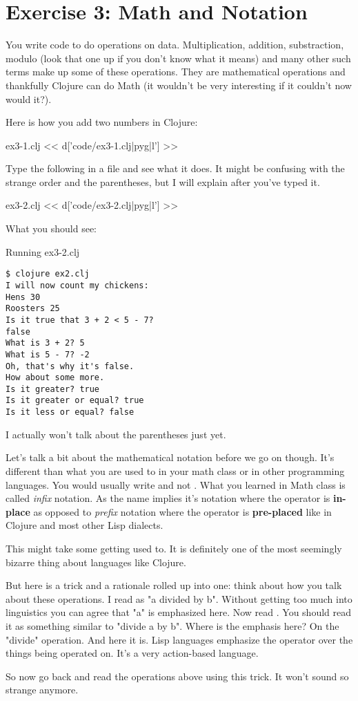 \chapter{Exercise 3: Math and Notation}

You write code to do operations on data. Multiplication, addition, substraction,
modulo (look that one up if you don't know what it means) and many other such terms make up some of these operations. They are mathematical operations and thankfully Clojure can do Math (it wouldn't be very interesting if it couldn't now would it?). 

Here is how you add two numbers in Clojure:
\begin{code}{ex3-1.clj}
<< d['code/ex3-1.clj|pyg|l'] >>
\end{code}

Type the following in a file and see what it does. It might be confusing with the
strange order and the parentheses, but I will explain after you've typed it.

\begin{code}{ex3-2.clj}
<< d['code/ex3-2.clj|pyg|l'] >>
\end{code}

What you should see:

\begin{code}{Running ex3-2.clj}
\begin{Verbatim}
$ clojure ex2.clj 
I will now count my chickens:
Hens 30
Roosters 25
Is it true that 3 + 2 < 5 - 7?
false
What is 3 + 2? 5
What is 5 - 7? -2
Oh, that's why it's false.
How about some more.
Is it greater? true
Is it greater or equal? true
Is it less or equal? false
\end{Verbatim}
\end{code}

I actually won't talk about the parentheses just yet. 

Let's talk a bit about the mathematical notation before we go on though. It's 
different than what you are used to in your math class or in other programming 
languages. You would usually write  and not . What 
you learned in Math class is called {\em infix} notation. As the name implies it's 
notation where the operator is {\bf in-place} as opposed to {\em prefix} notation 
where the operator is {\bf pre-placed} like in Clojure and most other Lisp dialects.

This might take some getting used to. It is definitely one of the most seemingly bizarre thing about languages like Clojure.

But here is a trick and a rationale rolled up into one: think about how you talk about these operations. I read  as "a divided by b". Without getting too much into linguistics you can agree that "a" is emphasized here. Now read . You should read it as something similar to "divide a by b". Where is the emphasis here? On the "divide" operation. And here it is. Lisp languages emphasize the operator over the things being operated on. It's a very action-based language.

So now go back and read the operations above using this trick. It won't sound so strange anymore.

